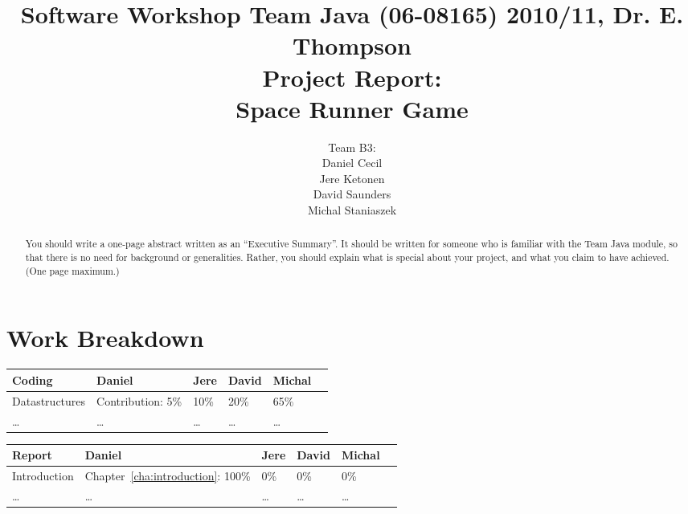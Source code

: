 \documentclass[10pt]{report}
\title{%
{\normalsize Software Workshop Team Java (06-08165) 2010/11, Dr. E. Thompson}\\[2cm]
Project Report:\\
Space Runner Game}
\author{Team B3:\\
Daniel Cecil\\
Jere Ketonen\\
David Saunders\\
Michal Staniaszek
}
\begin{document}
\maketitle
\chapter*{Work Breakdown}
\label{work-breakdown}

\thispagestyle{empty}

{\small

\noindent\begin{tabular}{|l||l|l|l|l|l|}\hline
  \textbf{Coding} & \textbf{Daniel} & \textbf{Jere} & \textbf{David}
 & \textbf{Michal} \\\hline\hline
 Datastructures & Contribution: 5\% & 10\% & 20\% & 65\%\\\hline
 \ldots & \ldots & \ldots & \ldots & \ldots \\\hline
\end{tabular}\vspace*{1cm}

\noindent\begin{tabular}{|l||l|l|l|l|l|}\hline
  \textbf{Report} & \textbf{Daniel} & \textbf{Jere} & \textbf{David}
 & \textbf{Michal}\\\hline\hline
 Introduction & Chapter~\ref{cha:introduction}: 100\% & 0\% & 0\% & 0\%\\\hline
 \ldots & \ldots & \ldots & \ldots & \ldots \\\hline
\end{tabular}

}     %

\tableofcontents
\thispagestyle{empty}

\begin{abstract}
  You should write a one-page abstract written as an ``Executive Summary''. It
  should be written for someone who is familiar with the Team Java module, so
  that there is no need for background or generalities. Rather, you should
  explain what is special about your project, and what you claim to have
  achieved. (One page maximum.)
\end{abstract}




\appendix



\end{document}
